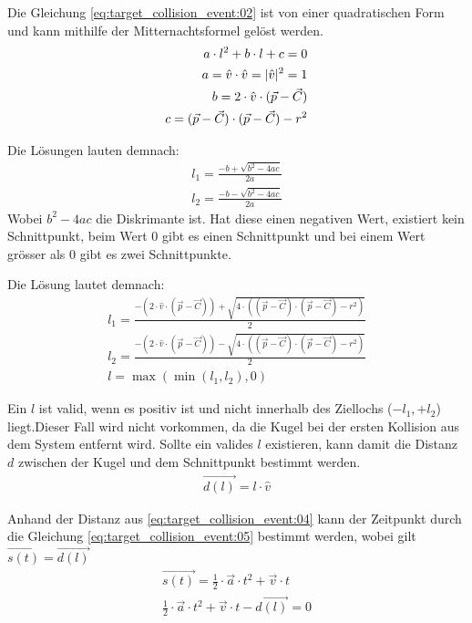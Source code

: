 Die Gleichung \ref{eq:target_collision_event:02} ist von einer quadratischen Form und kann mithilfe der Mitternachtsformel
gelöst werden.
\begin{align}
    a \cdot l^2 + b \cdot l + c = 0\\
    a = \hat{v} \cdot \hat{v} = \lvert \hat{v} \rvert^2 = 1\\
    b = 2 \cdot \hat{v} \cdot (\vec{p} - \vec{C})\\
    c = (\vec{p} - \vec{C}) \cdot (\vec{p} - \vec{C}) - r^2
\end{align}

Die Lösungen lauten demnach:
\begin{align}
    l_1 = \frac{-b + \sqrt{b^2 - 4ac}}{2a}\\
    l_2 = \frac{-b - \sqrt{b^2 - 4ac}}{2a}
\end{align}
Wobei $b^2 - 4ac$ die Diskrimante ist. Hat diese einen negativen Wert, existiert kein Schnittpunkt,
beim Wert $0$ gibt es einen Schnittpunkt und bei einem Wert grösser als $0$ gibt es zwei Schnittpunkte.

Die Lösung lautet demnach:
\begin{align}
    l_1 = \frac{-(2 \cdot \hat{v} \cdot (\vec{p} - \vec{C})) + \sqrt{4 \cdot ((\vec{p} - \vec{C}) \cdot (\vec{p} - \vec{C}) - r^2)}}{2}\\
    l_2 = \frac{-(2 \cdot \hat{v} \cdot (\vec{p} - \vec{C})) - \sqrt{4 \cdot ((\vec{p} - \vec{C}) \cdot (\vec{p} - \vec{C}) - r^2)}}{2}\\
    l = \max{(\min{(l_1, l_2)}, 0)}
\end{align}

Ein $l$ ist valid, wenn es positiv ist und nicht innerhalb des Ziellochs ($-l_1, +l_2$) liegt.Dieser Fall wird nicht vorkommen, da die
Kugel bei der ersten Kollision aus dem System entfernt wird.
Sollte ein valides $l$ existieren, kann damit die Distanz $d$ zwischen der Kugel und dem Schnittpunkt bestimmt werden.
\begin{align}
    \vec{d(l)} = l \cdot \hat{v}\label{eq:target_collision_event:04}
\end{align}

Anhand der Distanz aus \ref{eq:target_collision_event:04} kann der Zeitpunkt durch die Gleichung \ref{eq:target_collision_event:05}
bestimmt werden, wobei gilt $\vec{s(t)} = \vec{d(l)}$
\begin{align}
    \vec{s(t)} = \frac{1}{2} \cdot \vec{a} \cdot t^2 + \vec{v} \cdot t\\\label{eq:target_collision_event:05}
    \frac{1}{2} \cdot \vec{a} \cdot t^2 + \vec{v} \cdot t - \vec{d(l)} = 0
\end{align}

